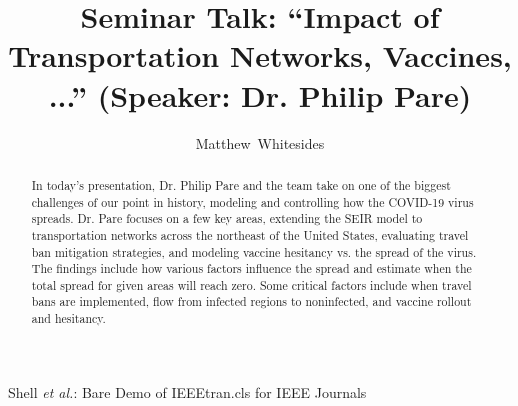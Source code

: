 \documentclass[journal,onecolumn]{IEEEtran}
\begin{document}
%
\title{Seminar Talk: ``Impact of Transportation Networks, Vaccines, ...'' (Speaker: Dr. Philip Pare)}

%
%
%
\author{Matthew~Whitesides}%

%
{Shell \MakeLowercase{\textit{et al.}}: Bare Demo of IEEEtran.cls for IEEE Journals}

\maketitle

\begin{abstract}
  In today's presentation, Dr. Philip Pare and the team take on one of the biggest challenges of our point in history, modeling and controlling how the COVID-19 virus spreads. Dr. Pare focuses on a few key areas, extending the SEIR model to transportation networks across the northeast of the United States, evaluating travel ban mitigation strategies, and modeling vaccine hesitancy vs. the spread of the virus. The findings include how various factors influence the spread and estimate when the total spread for given areas will reach zero. Some critical factors include when travel bans are implemented, flow from infected regions to noninfected, and vaccine rollout and hesitancy. 
\end{abstract}

\end{document}
